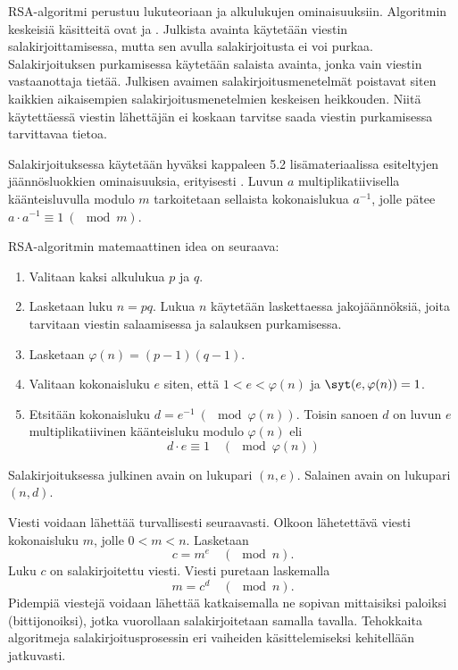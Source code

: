 RSA-algoritmi perustuu lukuteoriaan ja alkulukujen ominaisuuksiin. Algoritmin keskeisiä käsitteitä ovat  ja . Julkista avainta käytetään viestin salakirjoittamisessa, mutta sen avulla salakirjoitusta ei voi purkaa. Salakirjoituksen purkamisessa käytetään salaista avainta, jonka vain viestin vastaanottaja tietää. Julkisen avaimen salakirjoitusmenetelmät poistavat siten kaikkien aikaisempien salakirjoitusmenetelmien keskeisen heikkouden. Niitä käytettäessä viestin lähettäjän ei koskaan tarvitse saada viestin purkamisessa tarvittavaa tietoa. 

Salakirjoituksessa käytetään hyväksi kappaleen 5.2 lisämateriaalissa esiteltyjen jään\-nös\-luok\-kien ominaisuuksia, erityisesti . Luvun $a$ multiplikatiivisella käänteisluvulla modulo $m$ tarkoitetaan sellaista kokonaislukua $a^{-1}$, jolle pätee $a\cdot a^{-1} \equiv 1 \ (\mod m)$.

RSA-algoritmin matemaattinen idea on seuraava:
\begin{enumerate}
\item Valitaan kaksi alkulukua $p$ ja $q$.
\item Lasketaan luku $n=pq$. Lukua $n$ käytetään laskettaessa jakojäännöksiä, joita tarvitaan viestin salaamisessa ja salauksen purkamisessa.
\item Lasketaan $\varphi(n)=(p-1)(q-1)$. 
\item Valitaan kokonaisluku $e$ siten, että $1<e<\varphi(n)$ ja $\syt(e,\varphi(n))=1$.
\item Etsitään kokonaisluku $d = e^{-1}\ (\mod \varphi(n))$. Toisin sanoen $d$ on luvun $e$  multiplikatiivinen käänteisluku modulo $\varphi(n)$ eli
\[
d\cdot e \equiv 1\quad (\mod\varphi(n)) %
\]
\end{enumerate}
Salakirjoituksessa julkinen avain on lukupari $(n, e)$. Salainen avain on lukupari $(n, d)$. 

Viesti voidaan lähettää turvallisesti seuraavasti. Olkoon lähetettävä viesti kokonaisluku $m$, jolle $0<m<n$. Lasketaan
\[
c= m^e\quad (\mod n).
\]
Luku $c$ on salakirjoitettu viesti. Viesti puretaan laskemalla
\[
m=c^d\quad (\mod n).
\]
Pidempiä viestejä voidaan lähettää katkaisemalla ne sopivan mittaisiksi paloiksi (bittijonoiksi), jotka vuorollaan salakirjoitetaan samalla tavalla. Tehokkaita algoritmeja salakirjoitusprosessin eri vaiheiden käsittelemiseksi kehitellään jatkuvasti.

